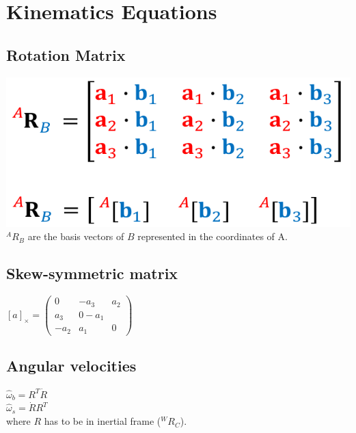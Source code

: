 \section{Kinematics Equations}
\subsection*{Rotation Matrix}
\includegraphics[width=\linewidth]{Images/RotMat.png}
$^A R_B$ are the basis vectors of $B$ represented in the coordinates of
A.
\subsection*{Skew-symmetric matrix}
$[a]_\times = \begin{pmatrix}
  0 & -a_3 & a_2 \\ 
  a_3 & 0 -a_1 \\
  -a_2 & a_1 & 0
\end{pmatrix}$

\subsection*{Angular velocities}
$\hat\omega_b = R^T \dot{R}$ \\
$\hat\omega_s = \dot{R}R^T$ \\
where $R$ has to be in inertial frame ($^W R_C$).

